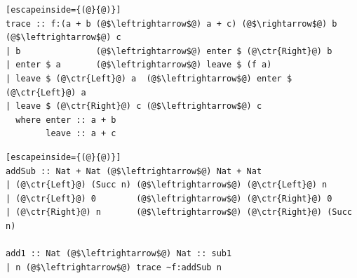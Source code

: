\documentclass{article}
\newcommand{\ctr}[1]{{\scriptsize{\texttt{#1}}}}
\begin{document}
\begin{multicols}{2}
\begin{lstlisting}[escapeinside={(@}{@)}]
trace :: f:(a + b (@$\leftrightarrow$@) a + c) (@$\rightarrow$@) b (@$\leftrightarrow$@) c
| b               (@$\leftrightarrow$@) enter $ (@\ctr{Right}@) b
| enter $ a       (@$\leftrightarrow$@) leave $ (f a)
| leave $ (@\ctr{Left}@) a  (@$\leftrightarrow$@) enter $ (@\ctr{Left}@) a
| leave $ (@\ctr{Right}@) c (@$\leftrightarrow$@) c
  where enter :: a + b
        leave :: a + c
 \end{lstlisting}

\begin{lstlisting}[escapeinside={(@}{@)}]
addSub :: Nat + Nat (@$\leftrightarrow$@) Nat + Nat
| (@\ctr{Left}@) (Succ n) (@$\leftrightarrow$@) (@\ctr{Left}@) n
| (@\ctr{Left}@) 0        (@$\leftrightarrow$@) (@\ctr{Right}@) 0
| (@\ctr{Right}@) n       (@$\leftrightarrow$@) (@\ctr{Right}@) (Succ n)

add1 :: Nat (@$\leftrightarrow$@) Nat :: sub1
| n (@$\leftrightarrow$@) trace ~f:addSub n
 \end{lstlisting}
\end{multicols}
\vspace{-10pt}
\end{document}
